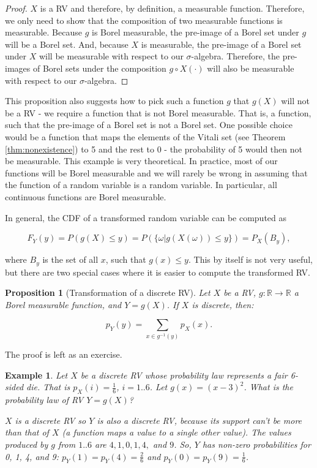 \documentclass{book}
\theoremstyle{plain}%
\newtheorem{prototheorem}{Example}[section]
\newenvironment{cexample}
   {\colorlet{shadecolor}{gray!10}\begin{shaded}\begin{prototheorem}}
   {\end{prototheorem}\end{shaded}}
\newtheorem{proposition}{Proposition}[section]
\theoremstyle{definition}
\newlength{\arrow}
\begin{document}
\begin{proof}
$X$ is a RV and therefore, by definition, a measurable function. Therefore, we only need to show that the composition of two measurable functions is measurable. Because $g$ is Borel measurable, the pre-image of a Borel set under $g$ will be a Borel set. And, because $X$ is measurable, the pre-image of a Borel set under $X$ will be measurable with respect to our $\sigma$-algebra. Therefore, the pre-images of Borel sets under the composition $g \circ X(\cdot)$ will also be measurable with respect to our $\sigma$-algebra.
\end{proof}

This proposition also suggests how to pick such a function $g$ that $g(X)$ will not be a RV - we require a function that is not Borel measurable. That is, a function, such that the pre-image of a Borel set is not a Borel set. One possible choice would be a function that maps the elements of the Vitali set (see Theorem \ref{thm:nonexistence}) to 5 and  the rest to 0 - the probability of 5 would then not be measurable. This example is very theoretical. In practice, most of our functions will be Borel measurable and we will rarely be wrong in assuming that the function of a random variable is a random variable. In particular, all continuous functions are Borel measurable.

In general, the CDF of a transformed random variable can be computed as

$$F_Y(y) = P(g(X) \leq y) = P(\{\omega|g(X(\omega)) \leq y\}) = P_X(B_y),$$

where $B_y$ is the set of all $x$, such that $g(x) \leq y$. This by itself is not very useful, but there are two special cases where it is easier to compute the transformed RV.

\begin{proposition}[Transformation of a discrete RV]
Let $X$ be a RV, $g: \mathbb{R} \rightarrow \mathbb{R}$ a Borel measurable function, and $Y = g(X)$. If $X$ is discrete, then:

$$p_Y(y) = \sum_{x \in g^{-1}(y)} p_X(x).$$\label{prop:transd}
\end{proposition}

The proof is left as an exercise.

\begin{cexample}
Let $X$ be a discrete RV whose probability law represents a fair 6-sided die. That is $p_X(i) = \frac{1}{6}$, $i = 1..6$. Let $g(x) = (x - 3)^2$. What is the probability law of RV $Y = g(X)$?

$X$ is a discrete RV so $Y$ is also a discrete RV, because its support can't be more than that of $X$ (a function maps a value to a single other value). The values produced by $g$ from $1..6$ are $4, 1, 0, 1, 4,$ and $9$. So, $Y$ has non-zero probabilities for 0, 1, 4, and 9: $p_Y(1) = p_Y(4) = \frac{2}{6}$ and $p_Y(0) = p_Y(9) = \frac{1}{6}$.
\end{cexample}
\end{document}
